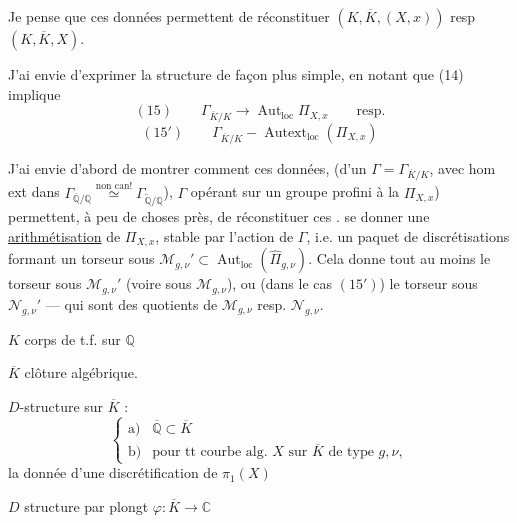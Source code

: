 Je pense que ces données permettent de réconstituer $(K,\overline K,(X,x))$
resp $(K,\overline K,X)$.

J'ai envie d'exprimer la structure de façon plus simple, en notant que (14)
 implique
\[
(15)\qquad\Gamma_{\overline K/K}\longrightarrow\operatorname{Aut}_{\mathrm{loc}}\Pi_{X,x}
\qquad\text{resp.}
\]
\[
(15')\qquad\Gamma_{\overline K/K}\mathbin{-}\operatorname{Autext}_{\mathrm{loc}}(\Pi_{X,x})
\]

J'ai envie d'abord de montrer comment ces données,
 (d'un
$\Gamma=\Gamma_{\overline K/K}$, avec hom ext dans
$\Gamma_{\overline{\mathbb Q}/\mathbb Q}\overset{\text{non can!}}\simeq
\Gamma_{\widetilde{\mathbb Q}/\mathbb Q}$),
$\Gamma$ opérant sur un groupe profini à la $\Pi_{X,x}$) permettent, à peu de
choses près, de réconstituer ces .
 se donner une
\uline{arithmétisation} de $\Pi_{X,x}$,
stable par l'action de $\Gamma$, i.e. un paquet de discrétisations
 formant un torseur sous
$\mathcal M_{g,\nu}'\subset\operatorname{Aut}_{\mathrm{loc}}(\widehat\Pi_{g,\nu})$.
Cela donne tout au moins le torseur sous $\mathcal M_{g,\nu}'$
(voire sous $\mathcal M_{g,\nu}$), ou (dans le cas $(15')$) le torseur sous
$\mathcal N_{g,\nu}'$ --- qui sont des quotients de $\mathcal M_{g,\nu}$
resp. $\mathcal N_{g,\nu}$.

$K$ corps de t.f. sur $\mathbb Q$

$\overline K$ clôture algébrique.

$D$-structure sur $\overline K$ :
\[
\left\{\begin{array}{ll}
\text{a)}&\overline{\mathbb Q}\subset\overline K\\
\text{b)}&\text{pour tt courbe alg. }X\text{ sur }\overline K\text{ de type }g,\nu,
\end{array}\right.
\]
la donnée d'une discrétification de $\pi_1(X)$

$D$ structure   par plongt
$\varphi:\overline K\longrightarrow\mathbb C$


